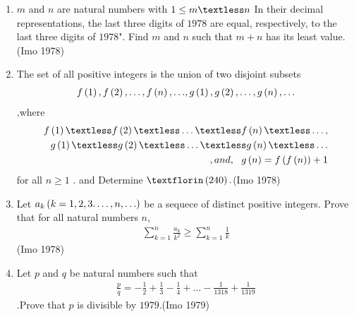 \begin{enumerate}
	\item $m$ and $n$ are natural numbers with $1 \leq m \textless n$ In their decimal representations, the last three digits of $1978$ are equal, respectively, to the last three digits of $1978$". Find $m$ and $n$ such that $m+n$ has its least value.\hfill(Imo 1978)

\item The set of all positive integers is the union of two disjoint subsets 
\begin{align}
{f\ensuremath{\left(1\right)}, f\ensuremath{\left(2\right)} ,\ldots,f\ensuremath{\left(n\right)},\ldots} ,{ g\left(1\right),g\left(2\right),\ldots,g\left(n\right),\ldots} 
\end{align},where
\begin{align}
f\brak{1}\textless f\brak{2} \textless \ldots \textless f\brak{n} \textless \ldots,\\ g\brak{1} \textless g\brak{2} \textless \ldots \textless g\brak{n}\textless \ldots\\, and,\ \   g\brak{n}=f\brak{f\brak{n}} + 1
\end{align}
for all $n \geq 1$
		. and Determine $ƒ\brak{240}.$\hfill(Imo 1978)

\item Let ${a_{k}\left(k=1,2,3.\ldots,n,\ldots\right)}$ be a sequece of distinct positive integers. Prove that for all natural numbers $n$,\begin{align}\sum_{k=1}^{n} \frac{a_{k}}{k^2} \geq \sum_{k=1}^{n} \frac{1}{k}\end{align}\hfill(Imo 1978)

\item Let $p$ and $q$ be natural numbers such that \begin{align}\frac{p}{q}=-\frac{1}{2}+\frac{1}{3}-\frac{1}{4}+\ldots -\frac{1}{1318}+\frac{1}{1319}\end{align}.Prove that $p$ is divisible by $1979$.\hfill(Imo 1979)


\end{enumerate}
